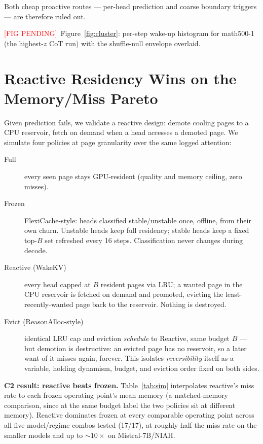 \documentclass[11pt]{article}
\newcommand{\NEEDFIG}{\textcolor{red}{[FIG PENDING]}}
\begin{document}
Both cheap proactive routes --- per-head prediction and coarse
boundary triggers --- are therefore ruled out.

\NEEDFIG~Figure~\ref{fig:cluster}: per-step wake-up histogram for
math500-1 (the highest-$z$ CoT run) with the shuffle-null envelope
overlaid.

\section{Reactive Residency Wins on the Memory/Miss Pareto}
\label{sec:sim}

Given prediction fails, we validate a reactive design: demote cooling
pages to a CPU reservoir, fetch on demand when a head accesses a
demoted page. We simulate four policies at page granularity over the
same logged attention:

\begin{description}
    \item[Full] every seen page stays GPU-resident (quality and memory
        ceiling, zero misses).
    \item[Frozen] FlexiCache-style: heads classified stable/unstable
        once, offline, from their own churn. Unstable heads keep full
        residency; stable heads keep a fixed top-$B$ set refreshed
        every 16 steps. Classification never changes during decode.
    \item[Reactive (WakeKV)] every head capped at $B$ resident pages
        via LRU; a wanted page in the CPU reservoir is fetched on
        demand and promoted, evicting the least-recently-wanted page
        back to the reservoir. Nothing is destroyed.
    \item[Evict (ReasonAlloc-style)] identical LRU cap and eviction
        \emph{schedule} to Reactive, same budget $B$ --- but demotion is
        destructive: an evicted page has no reservoir, so a later want
        of it misses again, forever. This isolates \emph{reversibility}
        itself as a variable, holding dynamism, budget, and eviction
        order fixed on both sides.
\end{description}

\textbf{C2 result: reactive beats frozen.} Table~\ref{tab:sim}
interpolates reactive's miss rate to each frozen operating point's mean
memory (a matched-memory comparison, since at the same budget label the
two policies sit at different memory). Reactive dominates frozen at
every comparable operating point across all five model/regime combos
tested (17/17), at roughly half the miss rate on the smaller models and
up to $\sim$$10\times$ on Mistral-7B/NIAH.
\end{document}
